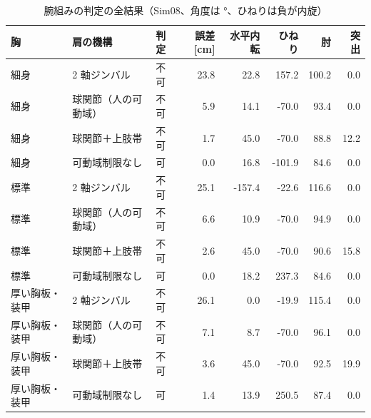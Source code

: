 \begin{longtable}{llcrrrrr}
\caption{腕組みの判定の全結果（Sim08、角度は °、ひねりは負が内旋）}\\
\toprule
胸 & 肩の機構 & 判定 & 誤差 [cm] & 水平内転 & ひねり & 肘 & 突出 \\ \midrule \endhead
細身 & 2 軸ジンバル & 不可 & 23.8 & 22.8 & 157.2 & 100.2 & 0.0 \\
細身 & 球関節（人の可動域） & 不可 & 5.9 & 14.1 & -70.0 & 93.4 & 0.0 \\
細身 & 球関節＋上肢帯 & 不可 & 1.7 & 45.0 & -70.0 & 88.8 & 12.2 \\
細身 & 可動域制限なし & 可 & 0.0 & 16.8 & -101.9 & 84.6 & 0.0 \\
標準 & 2 軸ジンバル & 不可 & 25.1 & -157.4 & -22.6 & 116.6 & 0.0 \\
標準 & 球関節（人の可動域） & 不可 & 6.6 & 10.9 & -70.0 & 94.9 & 0.0 \\
標準 & 球関節＋上肢帯 & 不可 & 2.6 & 45.0 & -70.0 & 90.6 & 15.8 \\
標準 & 可動域制限なし & 可 & 0.0 & 18.2 & 237.3 & 84.6 & 0.0 \\
厚い胸板・装甲 & 2 軸ジンバル & 不可 & 26.1 & 0.0 & -19.9 & 115.4 & 0.0 \\
厚い胸板・装甲 & 球関節（人の可動域） & 不可 & 7.1 & 8.7 & -70.0 & 96.1 & 0.0 \\
厚い胸板・装甲 & 球関節＋上肢帯 & 不可 & 3.6 & 45.0 & -70.0 & 92.5 & 19.9 \\
厚い胸板・装甲 & 可動域制限なし & 可 & 1.4 & 13.9 & 250.5 & 87.4 & 0.0 \\
\bottomrule
\end{longtable}

